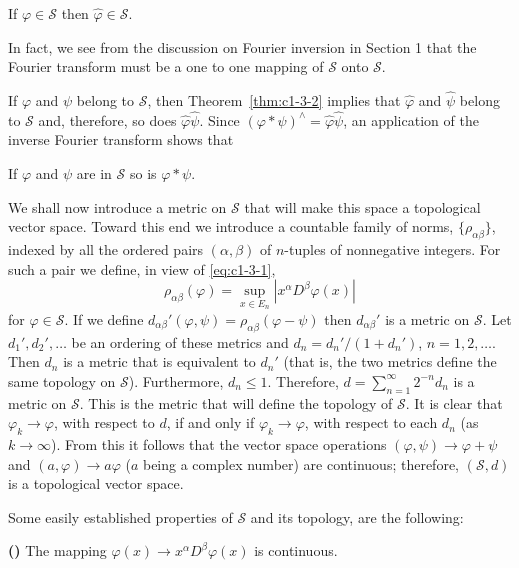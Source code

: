 \begin{theorem}\label{thm:c1-3-2}
If $\varphi \in \mathscr{S}$ then $\hat{\varphi} \in \mathscr{S}$.
\end{theorem}

In fact, we see from the discussion on Fourier inversion in Section 1 that the
Fourier transform must be a one to one mapping of $\mathscr{S}$ onto
$\mathscr{S}$.

If $\varphi$ and $\psi$ belong to $\mathscr{S}$, then
Theorem~\ref{thm:c1-3-2} implies that $\hat{\varphi}$ and $\hat{\psi}$ belong
to $\mathscr{S}$ and, therefore, so does $\hat{\varphi}\hat{\psi}$. Since
$(\varphi * \psi)^{\wedge} = \hat{\varphi}\hat{\psi}$, an application of the
inverse Fourier transform shows that

\begin{theorem}\label{thm:c1-3-3}
If $\varphi$ and $\psi$ are in $\mathscr{S}$ so is $\varphi * \psi$.
\end{theorem}

We shall now introduce a metric on $\mathscr{S}$ that will make this space a
topological vector space. Toward this end we introduce a countable family of
norms, $\{\rho_{\alpha\beta}\}$, indexed by all the ordered pairs
$(\alpha, \beta)$ of $n$-tuples of nonnegative integers. For such a pair we
define, in view of \eqref{eq:c1-3-1},
\[
\rho_{\alpha\beta}(\varphi)=\sup_{x\in E_{n}}|x^{\alpha}D^{\beta}\varphi(x)|
\]
for $\varphi \in \mathscr{S}$. If we define
$d_{\alpha\beta}'(\varphi, \psi) = \rho_{\alpha\beta}(\varphi - \psi)$ then
$d_{\alpha\beta}'$ is a metric on $\mathscr{S}$. Let $d_{1}', d_{2}', \ldots$
be an ordering of these metrics and $d_{n} = d_{n}'/(1 + d_{n}')$,
$n = 1, 2, \ldots$. Then $d_{n}$ is a metric that is equivalent to $d_{n}'$
(that is, the two metrics define the same topology on $\mathscr{S}$).
Furthermore, $d_{n} \leq 1$. Therefore,
$d = \sum_{n=1}^{\infty} 2^{-n}d_{n}$ is a metric on $\mathscr{S}$. This is
the metric that will define the topology of $\mathscr{S}$. It is clear that
$\varphi_{k} \to \varphi$, with respect to $d$, if and only if $\varphi_{k} \to \varphi$,
with respect to each $d_{n}$ (as $k \to \infty$). From this it follows that
the vector space operations $(\varphi, \psi) \to \varphi + \psi$ and
$(a, \varphi) \to a\varphi$ ($a$ being a complex number) are continuous;
therefore, $(\mathscr{S}, d)$ is a topological vector space.

Some easily established properties of $\mathscr{S}$ and its topology, are the
following:

\label{eq:c1-3-4}\textbf{(\theequation)}\quad
The mapping $\varphi(x) \to x^{\alpha}D^{\beta}\varphi(x)$ is continuous.


